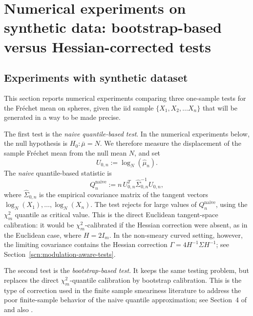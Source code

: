 \documentclass{amsart}
\theoremstyle{definition}
\theoremstyle{remark}
\newcommand{\mubar}{\bar{\mu}}
\newcommand\0{\boldsymbol{0}}
\begin{document}
\section{Numerical experiments on synthetic data: bootstrap-based versus Hessian-corrected tests}
\label{sec:numerical-bootstrap-vs-hessian}

\subsection{Experiments with synthetic dataset}

This section reports numerical experiments comparing three one-sample tests for the Fréchet mean on spheres, given the iid sample $\{X_1, X_2, \dots X_n\}$ that will be generated in a way to be made precise.

The first test is the \emph{naive quantile-based test}.  In the numerical experiments below, the null hypothesis is \(H_0:\mubar=N\).  We therefore measure the displacement of the sample Fr\'echet mean from the null mean \(N\), and set
\[
U_{0,n}:=\log_N(\hat\mu_n).
\]
The \textit{naive} quantile-based statistic is
\[
Q_n^{\mathrm{naive}}
:=
n\,U_{0,n}^{T}\widehat\Sigma_{0,n}^{-1}U_{0,n},
\]
where \(\widehat\Sigma_{0,n}\) is the empirical covariance matrix of the tangent vectors
\(\log_N(X_1),\dots,\log_N(X_n)\).  The test rejects for large values of
\(Q_n^{\mathrm{naive}}\), using the \(\chi_m^2\) quantile as critical value.  This is the direct Euclidean tangent-space calibration: it would be \(\chi_m^2\)-calibrated if the Hessian correction were absent, as in the Euclidean case, where $H=2I_m$.  In the non-smeary curved setting, however, the limiting covariance contains the Hessian correction \(\Gamma=4H^{-1}\Sigma H^{-1}\); see Section~\ref{scn:modulation-aware-tests}.

The second test is the \emph{bootstrap-based test}. It keeps the same testing problem, but replaces
the direct \(\chi_m^2\)-quantile calibration by bootstrap calibration. This is the type of correction
used in the finite sample smeariness literature to address the poor finite-sample behavior of the
naive quantile approximation; see Section~4 of \cite{EltznerFSSonspheres} and also \cite{HH2}.
\end{document}
